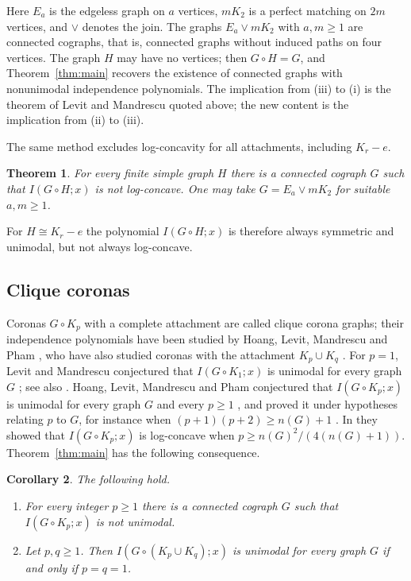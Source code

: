 \documentclass[11pt]{amsart}
\newtheorem{theorem}{Theorem}[section]
\newtheorem{corollary}[theorem]{Corollary}
\theoremstyle{remark}
\numberwithin{equation}{section}
\newcommand{\cor}{\circ}
\begin{document}
Here $E_a$ is the edgeless graph on $a$ vertices, $mK_2$ is a perfect matching on $2m$ vertices, and $\vee$ denotes the join. The graphs $E_a\vee mK_2$ with $a,m\ge 1$ are connected cographs, that is, connected graphs without induced paths on four vertices. The graph $H$ may have no vertices; then $G\cor H=G$, and Theorem~\ref{thm:main} recovers the existence of connected graphs with nonunimodal independence polynomials. The implication from (iii) to (i) is the theorem of Levit and Mandrescu quoted above; the new content is the implication from (ii) to (iii).

The same method excludes log-concavity for all attachments, including $K_r-e$.

\begin{theorem}\label{thm:logconcave}
For every finite simple graph $H$ there is a connected cograph $G$ such that $I(G\cor H;x)$ is not log-concave. One may take $G=E_a\vee mK_2$ for suitable $a,m\ge 1$.
\end{theorem}

For $H\cong K_r-e$ the polynomial $I(G\cor H;x)$ is therefore always symmetric and unimodal, but not always log-concave.

\subsection*{Clique coronas}
Coronas $G\cor K_p$ with a complete attachment are called clique corona graphs; their independence polynomials have been studied by Hoang, Levit, Mandrescu and Pham \cite{HLMP-Wp,HLMP-clique}, who have also studied coronas with the attachment $K_p\cup K_q$ \cite{HLMP-two}. For $p=1$, Levit and Mandrescu conjectured that $I(G\cor K_1;x)$ is unimodal for every graph $G$ \cite{LM03}; see also \cite[Section~4]{HLMP-clique}. Hoang, Levit, Mandrescu and Pham conjectured that $I(G\cor K_p;x)$ is unimodal for every graph $G$ and every $p\ge 1$ \cite[Conjecture~6.1]{HLMP-clique}, and proved it under hypotheses relating $p$ to $G$, for instance when $(p+1)(p+2)\ge n(G)+1$ \cite[Theorem~4.6]{HLMP-clique}. In \cite[Corollary~3.10]{HLMP-Wp} they showed that $I(G\cor K_p;x)$ is log-concave when $p\ge n(G)^2/(4(n(G)+1))$. Theorem~\ref{thm:main} has the following consequence.

\begin{corollary}\label{cor:clique}
The following hold.
\begin{enumerate}
\item[(a)] For every integer $p\ge 1$ there is a connected cograph $G$ such that $I(G\cor K_p;x)$ is not unimodal.
\item[(b)] Let $p,q\ge 1$. Then $I(G\cor(K_p\cup K_q);x)$ is unimodal for every graph $G$ if and only if $p=q=1$.
\end{enumerate}
\end{corollary}
\end{document}
